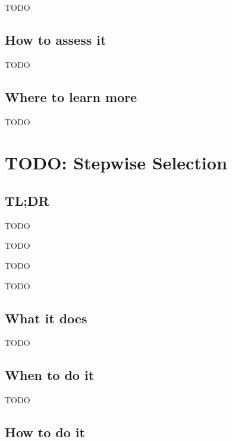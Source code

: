\documentclass[
]{book}
\providecommand{\tightlist}{%
  \setlength{\itemsep}{0pt}\setlength{\parskip}{0pt}}
\begin{document}
TODO

\hypertarget{how-to-assess-it-10}{%
\section{How to assess it}\label{how-to-assess-it-10}}

TODO

\hypertarget{where-to-learn-more-10}{%
\section{Where to learn more}\label{where-to-learn-more-10}}

TODO

\hypertarget{stepwise-selection}{%
\chapter{TODO: Stepwise Selection}\label{stepwise-selection}}

\hypertarget{tldr-11}{%
\section{TL;DR}\label{tldr-11}}

\begin{description}
\tightlist
\item[What it does]
TODO
\item[When to do it]
TODO
\item[How to do it]
TODO
\item[How to assess it]
TODO
\end{description}

\hypertarget{what-it-does-11}{%
\section{What it does}\label{what-it-does-11}}

TODO

\hypertarget{when-to-do-it-11}{%
\section{When to do it}\label{when-to-do-it-11}}

TODO

\hypertarget{how-to-do-it-11}{%
\section{How to do it}\label{how-to-do-it-11}}
\end{document}
